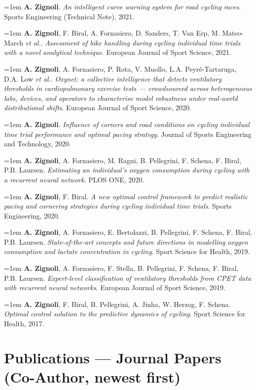 \documentclass[10pt,a4paper]{article}
\newcommand{\pub}[3]{%
  \hangindent=1em\hangafter=1
  \small #1. \textit{#2}. #3.\par\vspace{3pt}%
}
\begin{document}
\pub{\textbf{A. Zignoli}}{An intelligent curve warning system for road cycling races}{Sports Engineering (Technical Note), 2021}

\pub{\textbf{A. Zignoli}, F. Biral, A. Fornasiero, D. Sanders, T. Van Erp, M. Mateo-March \textit{et al.}}{Assessment of bike handling during cycling individual time trials with a novel analytical technique}{European Journal of Sport Science, 2021}

\pub{\textbf{A. Zignoli}, A. Fornasiero, P. Rota, V. Muollo, L.A. Peyré-Tartaruga, D.A. Low \textit{et al.}}{Oxynet: a collective intelligence that detects ventilatory thresholds in cardiopulmonary exercise tests — crowdsourced across heterogeneous labs, devices, and operators to characterise model robustness under real-world distributional shifts}{European Journal of Sport Science, 2020}

\pub{\textbf{A. Zignoli}}{Influence of corners and road conditions on cycling individual time trial performance and optimal pacing strategy}{Journal of Sports Engineering and Technology, 2020}

\pub{\textbf{A. Zignoli}, A. Fornasiero, M. Ragni, B. Pellegrini, F. Schena, F. Biral, P.B. Laursen}{Estimating an individual's oxygen consumption during cycling with a recurrent neural network}{PLOS ONE, 2020}

\pub{\textbf{A. Zignoli}, F. Biral}{A new optimal control framework to predict realistic pacing and cornering strategies during cycling individual time trials}{Sports Engineering, 2020}

\pub{\textbf{A. Zignoli}, A. Fornasiero, E. Bertolazzi, B. Pellegrini, F. Schena, F. Biral, P.B. Laursen}{State-of-the-art concepts and future directions in modelling oxygen consumption and lactate concentration in cycling}{Sport Science for Health, 2019}

\pub{\textbf{A. Zignoli}, A. Fornasiero, F. Stella, B. Pellegrini, F. Schena, F. Biral, P.B. Laursen}{Expert-level classification of ventilatory thresholds from CPET data with recurrent neural networks}{European Journal of Sport Science, 2019}

\pub{\textbf{A. Zignoli}, F. Biral, B. Pellegrini, A. Jinha, W. Herzog, F. Schena}{Optimal control solution to the predictive dynamics of cycling}{Sport Science for Health, 2017}

\section{Publications — Journal Papers (Co-Author, newest first)}
\end{document}

